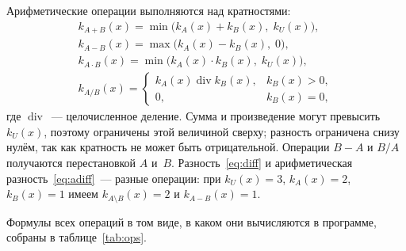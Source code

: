 \documentclass[14pt,a4paper]{extarticle}
\newcommand{\kA}{k_A(x)}
\newcommand{\kB}{k_B(x)}
\newcommand{\kU}{k_U(x)}
\begin{document}
Арифметические операции выполняются над кратностями:
\begin{gather}
k_{A + B}(x) = \min\bigl(\kA + \kB,\; \kU\bigr), \label{eq:asum}\\
k_{A - B}(x) = \max\bigl(\kA - \kB,\; 0\bigr), \label{eq:adiff}\\
k_{A \cdot B}(x) = \min\bigl(\kA \cdot \kB,\; \kU\bigr), \label{eq:aprod}\\
k_{A / B}(x) =
\begin{cases}
\kA \operatorname{div} \kB, & \kB > 0,\\
0, & \kB = 0,
\end{cases} \label{eq:adiv}
\end{gather}
где $\operatorname{div}$~--- целочисленное деление. Сумма и произведение могут превысить $\kU$, поэтому ограничены этой величиной сверху; разность ограничена снизу нулём, так как кратность не может быть отрицательной. Операции $B - A$ и $B / A$ получаются перестановкой $A$ и~$B$. Разность~\eqref{eq:diff} и арифметическая разность~\eqref{eq:adiff}~--- разные операции: при $\kU = 3$, $\kA = 2$, $\kB = 1$ имеем $k_{A \setminus B}(x) = 2$ и $k_{A - B}(x) = 1$.

Формулы всех операций в том виде, в каком они вычисляются в программе, собраны в таблице~\ref{tab:ops}.
\end{document}
